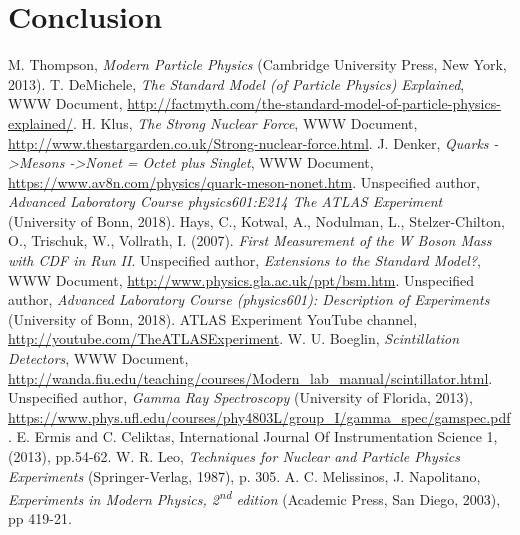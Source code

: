 \documentclass[twocolumn]{article}
\begin{document}
\section{Conclusion}
\begin{thebibliography}{9}
M. Thompson, \textsl{Modern Particle Physics} (Cambridge University Press, New York, 2013).
T. DeMichele, \textit{The Standard Model (of Particle Physics) Explained}, WWW Document, \url{http://factmyth.com/the-standard-model-of-particle-physics-explained/}.
H. Klus, \textit{The Strong Nuclear Force}, WWW Document, \url{http://www.thestargarden.co.uk/Strong-nuclear-force.html}.
J. Denker, \textit{Quarks -\textgreater Mesons -\textgreater Nonet = Octet plus Singlet}, WWW Document, \url{https://www.av8n.com/physics/quark-meson-nonet.htm}.
Unspecified author, \textsl{Advanced Laboratory Course physics601:E214 The ATLAS Experiment} (University of Bonn, 2018).
Hays, C., Kotwal, A., Nodulman, L., Stelzer-Chilton, O., Trischuk, W., Vollrath, I. (2007). \textsl{First Measurement of the W Boson Mass with CDF in Run II}.
Unspecified author, \textsl{Extensions to the Standard Model?}, WWW Document, \url{http://www.physics.gla.ac.uk/ppt/bsm.htm}.
Unspecified author, \textsl{Advanced Laboratory Course (physics601): Description of Experiments} (University of Bonn, 2018).
ATLAS Experiment YouTube channel, \url{http://youtube.com/TheATLASExperiment}.
 W. U. Boeglin, \textit{Scintillation Detectors}, WWW Document, \url{http://wanda.fiu.edu/teaching/courses/Modern_lab_manual/scintillator.html}.
Unspecified author, \textsl{Gamma Ray Spectroscopy} (University of Florida, 2013), \url{https://www.phys.ufl.edu/courses/phy4803L/group_I/gamma_spec/gamspec.pdf}.
E. Ermis and C. Celiktas, International Journal Of Instrumentation Science 1, (2013), pp.54-62.
W. R. Leo, \textsl{Techniques for Nuclear and Particle Physics Experiments} (Springer-Verlag, 1987), p. 305.
A. C. Melissinos, J. Napolitano, \textsl{Experiments in Modern Physics, 2\textsuperscript{nd} edition} (Academic Press, San Diego, 2003), pp 419-21.
\end{thebibliography}
\newpage
\onecolumn
\end{document}
